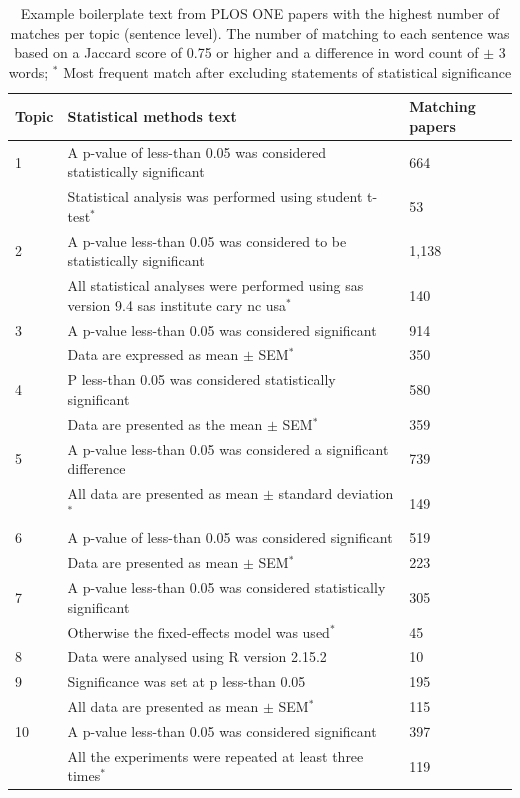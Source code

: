 \documentclass[12pt]{article}
\begin{document}
\begin{table}

\caption{\label{tab:plos-example-boilerplate} Example boilerplate text from PLOS ONE papers with the highest number of matches per topic (sentence level). The number of matching to each sentence was based on a Jaccard score of 0.75 or higher and a difference in word count of $\pm$ 3 words; $^{*}$ Most frequent match after excluding statements of statistical significance}
\centering
\begin{tabular}[t]{p{}p{}p{}}
\hline
Topic & Statistical methods text & Matching papers\\
\hline
1 & A p-value of less-than 0.05 was considered statistically significant & 664\\
 &  Statistical analysis was performed using student t-test$^{*}$ & 53\\
\hline
2 & A p-value less-than 0.05 was considered to be statistically significant & 1,138\\
 & All statistical analyses were performed using sas version 9.4 sas institute cary nc usa$^{*}$ & 140\\
\hline
3 & A p-value less-than 0.05 was considered significant & 914\\
 & Data are expressed as mean $\pm$ SEM$^{*}$ & 350\\
\hline
4 & P less-than 0.05 was considered statistically significant & 580\\
 &  Data are presented as the mean $\pm$ SEM$^{*}$ & 359\\
\hline
5 & A p-value less-than 0.05 was considered a significant difference & 739\\
 & All data are presented as mean $\pm$ standard deviation$^{*}$ & 149\\
\hline
6 & A p-value of less-than 0.05 was considered significant & 519\\
&  Data are presented as mean $\pm$ SEM$^{*}$ & 223\\
\hline
7 & A p-value less-than 0.05 was considered statistically significant & 305\\
 &  Otherwise the fixed-effects model was used$^{*}$ & 45\\
\hline
8 & Data were analysed using R version 2.15.2 & 10\\
\hline
9 & Significance was set at p less-than 0.05 & 195\\
& All data are presented as mean $\pm$ SEM$^{*}$ & 115\\
\hline
10 & A p-value less-than 0.05 was considered significant & 397\\
& All the experiments were repeated at least three times$^{*}$ & 119\\

\hline
\end{tabular}
\end{table}
\end{document}
